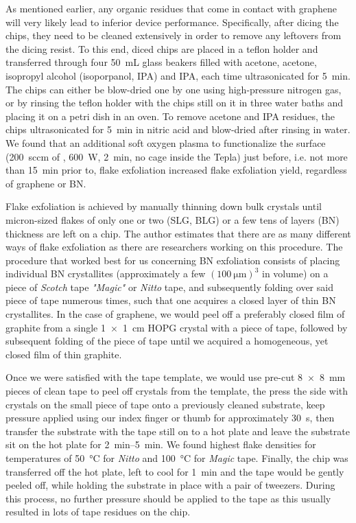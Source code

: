 As mentioned earlier, any organic residues that come in contact with graphene will very likely lead to inferior device performance.
% 
Specifically, after dicing the chips, they need to be cleaned extensively in order to remove any leftovers from the dicing resist.
% 
To this end, diced chips are placed in a teflon holder and transferred through four \SI{50}{\milli\liter} glass beakers filled with acetone, acetone, isopropyl alcohol (isoporpanol, IPA) and IPA, each time ultrasonicated for \SI{5}{\minute}.
% 
The chips can either be blow-dried one by one using high-pressure nitrogen gas, or by rinsing the teflon holder with the chips still on it in three water baths and placing it on a petri dish in an oven.
% 
To remove acetone and IPA residues, the chips ultrasonicated for \SI{5}{\minute} in nitric acid and blow-dried after rinsing in water.
% 
We found that an additional soft oxygen plasma to functionalize the  surface (\SI{200}{sccm} of , \SI{600}{\watt}, \SI{2}{\minute}, no cage inside the Tepla) just before, i.e. not more than \SI{15}{\minute} prior to, flake exfoliation increased flake exfoliation yield, regardless of graphene or BN.


Flake exfoliation is achieved by manually thinning down bulk crystals until micron-sized flakes of only one or two (SLG, BLG) or a few tens of layers (BN) thickness are left on a chip.
% 
The author estimates that there are as many different ways of flake exfoliation as there are researchers working on this procedure.
% 
The procedure that worked best for us concerning BN exfoliation consists of placing individual BN crystallites (approximately a few $(\SI{100}{\micro\meter})^3$ in volume) on a piece of \textit{Scotch} tape \textit{"Magic"} or \textit{Nitto} tape, and subsequently folding over said piece of tape numerous times, such that one acquires a closed layer of thin BN crystallites.
% 
In the case of graphene, we would peel off a preferably closed film of graphite from a single \SI{1x1}{\centi\meter} HOPG crystal with a piece of tape, followed by subsequent folding of the piece of tape until we acquired a homogeneous, yet closed film of thin graphite.

Once we were satisfied with the tape template, we would use pre-cut \SI{8x8}{\milli\meter} pieces of clean tape to peel off crystals from the template, the press the side with crystals on the small piece of tape onto a previously cleaned substrate, keep pressure applied using our index finger or thumb for approximately \SI{30}{\second}, then transfer the substrate with the tape still on to a hot plate and leave the substrate sit on the hot plate for \SIrange{2}{5}{\minute}.
% 
We found highest flake densities for temperatures of \SI{50}{\celsius} for \textit{Nitto} and \SI{100}{\celsius} for \textit{Magic} tape.
% 
Finally, the chip was transferred off the hot plate, left to cool for \SI{1}{\minute} and the tape would be gently peeled off, while holding the substrate in place with a pair of tweezers.
% 
During this process, no further pressure should be applied to the tape as this usually resulted in lots of tape residues on the chip.


